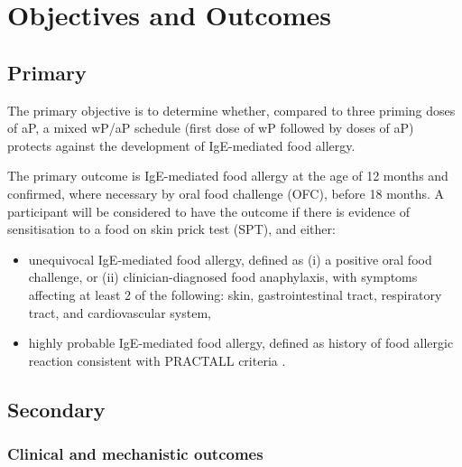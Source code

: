 \documentclass{bmcart}
\begin{document}
\section*{Objectives and Outcomes}

\subsection*{Primary}

The primary objective is to determine whether, compared to three priming doses of aP, a mixed wP/aP schedule (first dose of wP followed by doses of aP) protects against the development of IgE-mediated food allergy.

The primary outcome is IgE-mediated food allergy at the age of 12 months and confirmed, where necessary by oral food challenge (OFC), before 18 months.
A participant will be considered to have the outcome if there is evidence of sensitisation to a food on skin prick test (SPT), and either:
\begin{itemize}
	\item unequivocal IgE-mediated food allergy, defined as (i) a positive oral food challenge, or (ii) clinician-diagnosed food anaphylaxis, with symptoms affecting at least 2 of the following: skin, gastrointestinal tract, respiratory tract, and cardiovascular system,
	\item highly probable IgE-mediated food allergy, defined as history of food allergic reaction consistent with PRACTALL criteria \cite{sampson2012standardizing}.
\end{itemize}

\subsection*{Secondary}

\subsubsection*{Clinical and mechanistic outcomes}
\end{document}
